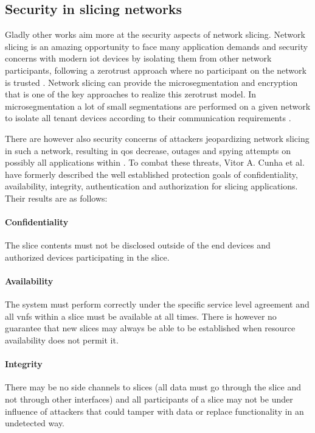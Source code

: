 \subsection{Security in slicing networks}
Gladly other works aim more at the security aspects of network slicing. Network slicing is an amazing opportunity to face many application demands and security concerns with modern \acrshort{iot} devices by isolating them from other network participants, following a \gls{zerotrust} approach where no participant on the network is trusted \cite{zerotrust}. Network slicing can provide the \gls{microsegmentation} and encryption that is one of the key approaches to realize this \gls{zerotrust} model. In \gls{microsegmentation} a lot of small segmentations are performed on a given network to isolate all tenant devices according to their communication requirements \cite{zerotrust}.

There are however also security concerns of attackers jeopardizing network slicing in such a network, resulting in \acrshort{qos} decrease, outages and spying attempts on possibly all applications within \cite{SE1}. To combat these threats, Vitor A. Cunha et al. \cite{SE1} have formerly described the well established protection goals of confidentiality, availability, integrity, authentication and authorization for slicing applications. Their results are as follows:

\paragraph{Confidentiality} The slice contents must not be disclosed outside of the end devices and authorized devices participating in the slice.

\paragraph{Availability} The system must perform correctly under the specific service level agreement and all \acrshort{vnf}s within a slice must be available at all times. There is however no guarantee that new slices may always be able to be established when resource availability does not permit it.

\paragraph{Integrity} There may be no side channels to slices (all data must go through the slice and not through other interfaces) and all participants of a slice may not be under influence of attackers that could tamper with data or replace functionality in an undetected way.

